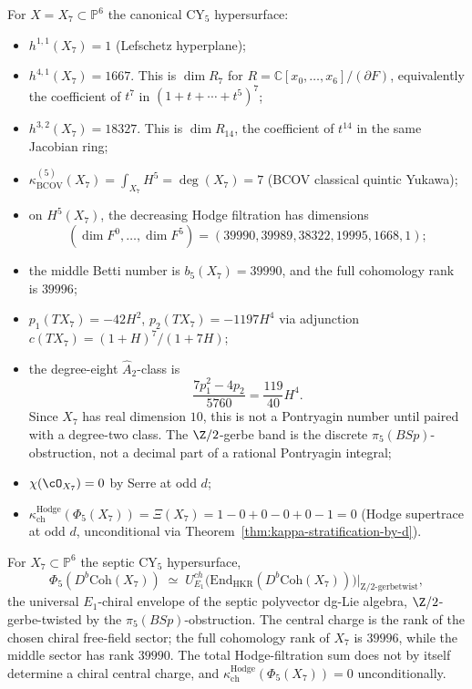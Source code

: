 For $X = X_7 \subset \mathbb{P}^6$ the canonical CY${}_5$ hypersurface:
\begin{itemize}
 \item $h^{1,1}(X_7) = 1$ \textup{(}Lefschetz hyperplane\textup{)};
 \item \(h^{4,1}(X_7)=1667\). This is
 \(\dim R_7\) for
 \(R=\mathbb C[x_0,\ldots,x_6]/(\partial F)\), equivalently the coefficient
 of \(t^7\) in \((1+t+\cdots+t^5)^7\);
 \item \(h^{3,2}(X_7)=18327\). This is \(\dim R_{14}\), the coefficient
 of \(t^{14}\) in the same Jacobian ring;
 \item $\kappa_{\mathrm{BCOV}}^{(5)}(X_7) = \int_{X_7} H^5 = \deg(X_7) = 7$ \textup{(}BCOV
 classical quintic Yukawa\textup{)};
 \item on \(H^5(X_7)\), the decreasing Hodge filtration has dimensions
 \[
 (\dim F^0,\ldots,\dim F^5)
 =(39990,39989,38322,19995,1668,1);
 \]
 \item the middle Betti number is \(b_5(X_7)=39990\), and the full
 cohomology rank is \(39996\);
 \item $p_1(TX_7) = -42 H^2$, $p_2(TX_7) = -1197 H^4$ via adjunction
 $c(TX_7) = (1+H)^7/(1+7H)$;
 \item the degree-eight \(\widehat A_2\)-class is
 \[
 \frac{7p_1^2-4p_2}{5760}=\frac{119}{40}H^4.
 \]
 Since \(X_7\) has real dimension \(10\), this is not a Pontryagin number
 until paired with a degree-two class. The \(\Z/2\)-gerbe band is the
 discrete \(\pi_5(BSp)\)-obstruction, not a decimal part of a rational
 Pontryagin integral;
 \item $\chi(\cO_{X_7}) = 0$ by Serre at odd $d$;
 \item $\kappa_{\mathrm{ch}}^{\mathrm{Hodge}}(\Phi_5(X_7)) = \Xi(X_7) = 1 - 0 + 0 - 0 + 0 - 1
 = 0$ \textup{(}Hodge supertrace at odd $d$, unconditional via
 Theorem~\ref{thm:kappa-stratification-by-d}\textup{)}.
\end{itemize}

\begin{conjecture}
\label{conj:cy5-phi-5-output-identification-septic}
\ClaimStatusConjectured
{}%
For $X_7 \subset \mathbb{P}^6$ the septic CY${}_5$ hypersurface,
\[
 \Phi_5(D^b\mathrm{Coh}(X_7)) \;\simeq\; U^{ch}_{E_1}\bigl(\mathrm{End}_{
 \mathrm{HKR}}(D^b\mathrm{Coh}(X_7))\bigr)\big|_{\mathrm{Z/2\text{-}gerbe twist}},
\]
the universal $E_1$-chiral envelope of the septic polyvector dg-Lie algebra,
$\Z/2$-gerbe-twisted by the $\pi_5(BSp)$-obstruction. The central charge is
the rank of the chosen chiral free-field sector; the full cohomology rank
of \(X_7\) is \(39996\), while the middle sector has rank \(39990\). The
total Hodge-filtration sum does not by itself determine a chiral central charge, and
$\kappa_{\mathrm{ch}}^{\mathrm{Hodge}}(\Phi_5(X_7)) = 0$ unconditionally.
\end{conjecture}


